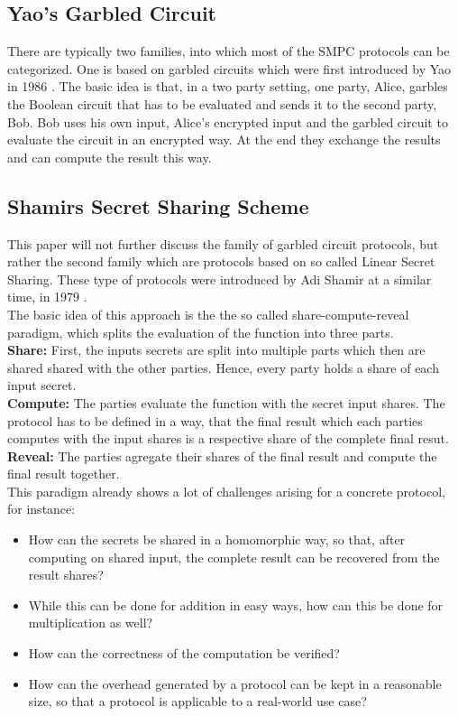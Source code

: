 \documentclass[english,runningheads,a4paper]{llncs}[2018/03/10]
\begin{document}
\subsection{Yao's Garbled Circuit}
There are typically two families, into which most of the SMPC protocols can be categorized. One is based on garbled circuits which were first introduced by Yao in 1986 \cite{4568207}. The basic idea is that, in a two party setting, one party, Alice, garbles the Boolean circuit that has to be evaluated and sends it to the second party, Bob. Bob uses his own input, Alice's encrypted input and the garbled circuit to evaluate the circuit in an encrypted way. At the end they exchange the results and can compute the result this way. 
\subsection{Shamirs Secret Sharing Scheme}
This paper will not further discuss the family of garbled circuit protocols, but rather the second family which are protocols based on so called Linear Secret Sharing. 
These type of protocols were introduced by Adi Shamir at a similar time, in 1979 \cite{Shamir:1979:SS:359168.359176}.\\
The basic idea of this approach is the the so called share-compute-reveal paradigm, which splits the evaluation of the function into three parts.\\
\textbf{Share:} First, the inputs secrets are split into multiple parts which then are shared shared with the other parties. Hence, every party holds a share of each input secret.\\
\textbf{Compute:} The parties evaluate the function with the secret input shares. The protocol has to be defined in a way, that the final result which each parties computes with the input shares is a respective share of the complete final resut.\\
\textbf{Reveal:} The parties agregate their shares of the final result and compute the final result together.\\
This paradigm already shows a lot of challenges arising for a concrete protocol, for instance:
\begin{itemize}
\item How can the secrets be shared in a homomorphic way, so that, after computing on shared input, the complete result can be recovered from the result shares?
\item While this can be done for addition in easy ways, how can this be done for multiplication as well?
\item How can the correctness of the computation be verified?
\item How can the overhead generated by a protocol can be kept in a reasonable size, so that a protocol is applicable to a real-world use case?
\end{itemize}
\end{document}

